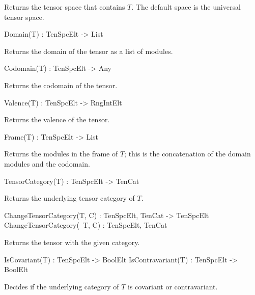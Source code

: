 Returns the tensor space that contains $T$. The default space is the universal 
tensor space.

\begin{intrinsics}
Domain(T) : TenSpcElt -> List
\end{intrinsics}

Returns the domain of the tensor as a list of modules.

\begin{intrinsics}
Codomain(T) : TenSpcElt -> Any
\end{intrinsics}

Returns the codomain of the tensor.

\begin{intrinsics}
Valence(T) : TenSpcElt -> RngIntElt
\end{intrinsics}

Returns the valence of the tensor.

\begin{intrinsics}
Frame(T) : TenSpcElt -> List
\end{intrinsics}

Returns the modules in the frame of $T$; this is the concatenation of
the domain modules and the codomain.

\begin{intrinsics}
TensorCategory(T) : TenSpcElt -> TenCat
\end{intrinsics}

Returns the underlying tensor category of $T$.

\begin{intrinsics}
ChangeTensorCategory(T, C) : TenSpcElt, TenCat -> TenSpcElt
ChangeTensorCategory(~T, C) : TenSpcElt, TenCat
\end{intrinsics}

Returns the tensor with the given category.

\begin{intrinsics}
IsCovariant(T) : TenSpcElt -> BoolElt
IsContravariant(T) : TenSpcElt -> BoolElt
\end{intrinsics}

Decides if the underlying category of $T$ is covariant or contravariant.

